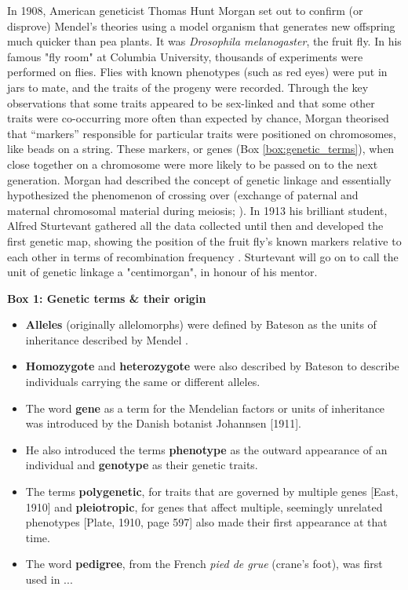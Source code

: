 In 1908, American geneticist Thomas Hunt Morgan set out to confirm (or disprove) Mendel’s theories using a model organism that generates new offspring much quicker than pea plants. 
It was \textit{Drosophila melanogaster}, the fruit fly. 
In his famous "fly room" at Columbia University, thousands of experiments were performed on flies. 
Flies with known phenotypes (such as red eyes) were put in jars to mate, and the traits of the progeny were recorded. 
Through the key observations that some traits appeared to be sex-linked and that some other traits were co-occurring more often than expected by chance, Morgan theorised that “markers” responsible for particular traits were positioned on chromosomes, like beads on a string. 
These markers, or genes (Box \ref{box:genetic_terms}), when close together on a chromosome were more likely to be passed on to the next generation. 
Morgan had described the concept of genetic linkage and essentially hypothesized the phenomenon of crossing over (exchange of paternal and maternal chromosomal material during meiosis; \cite{morgan1911random}). 
In 1913 his brilliant student, Alfred Sturtevant gathered all the data collected until then and developed the first genetic map, showing the position of the fruit fly’s known markers relative to each other in terms of recombination frequency \cite{sturtevant1913linear}. 
Sturtevant will go on to call the unit of genetic linkage a "centimorgan", in honour of his mentor.\\

\newpage


\begin{Comment}
\hspace{-2.5mm}\textbf{Box 1: Genetic terms \& their origin}\label{box:genetic_terms}
\small
\begin{itemize}
    \item \textbf{Alleles} (originally allelomorphs) were defined by Bateson as the units of inheritance described by Mendel \cite{bateson2013mendel}.
    \item \textbf{Homozygote} and \textbf{heterozygote} were also described by Bateson to describe individuals carrying the same or different alleles.
    \item The word \textbf{gene} as a term for the Mendelian factors or units of inheritance was introduced by the Danish botanist Johannsen [1911]. 
    \item He also introduced the terms \textbf{phenotype} as the outward appearance of an individual and \textbf{genotype} as their genetic traits. 
    \item The terms \textbf{polygenetic}, for traits that are governed by multiple genes [East, 1910] and \textbf{pleiotropic}, for genes that affect multiple, seemingly unrelated phenotypes [Plate, 1910, page 597] also made their first appearance at that time. 
    \item The word \textbf{pedigree}, from the French \textit{pied de grue} (crane's foot), was first used in ...
\end{itemize}
\vspace{4mm}
\end{Comment}

